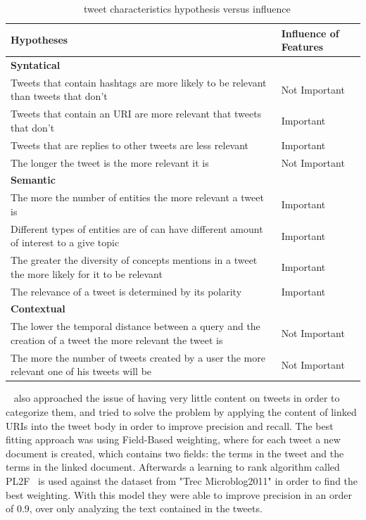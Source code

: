 \begin{table}[tb]
  \caption{~\citet{Tao2012} tweet characteristics hypothesis versus influence}
  \label{tab:tao_table}
  \begin{tabularx}{\textwidth}{|X|l|}
  \hline
  \textbf{Hypotheses} & \textbf{Influence of Features} \\
  \hline
  \hline

  {\bf Syntatical} &  \\
  \hline
  Tweets that contain hashtags are more likely to be relevant than tweets that don't & Not Important \\
  \hline
  Tweets that contain an URI are more relevant that tweets that don't  &Important \\
  \hline
  Tweets that are replies to other tweets are less relevant & Important \\
  \hline
  The longer the tweet is the more relevant it is & Not Important\\
  \hline
  \hline

  {\bf Semantic}  &  \\
  \hline
  
  The more the number of entities the more relevant a tweet is  & Important \\
  \hline
  Different types of entities are of can have different amount of interest to a give topic  & Important \\
  \hline
  The greater the diversity of concepts mentions in a tweet the more likely for it to be relevant & Important \\
  \hline
  The relevance of a tweet is determined by its polarity & Important \\
  \hline
  \hline

  {\bf Contextual} &  \\
  \hline
  The lower the temporal distance between a query and the creation of a tweet the more relevant the tweet is  & Not Important \\
  \hline
  The more the number of tweets created by a user the more relevant one of his tweets will be & Not Important \\
  \hline
  \end{tabularx}
\end{table}

~\citet{McCreadie2013} also approached the issue of having very little content on tweets in order to categorize them, and tried to solve the problem by applying the content of linked URIs into the tweet body in order to improve precision and recall. The best fitting approach was using Field-Based weighting, where for each tweet a new document is created, which contains two fields: the terms in the tweet and the terms in the linked document. 
Afterwards a learning to rank algorithm called PL2F~\cite{macdonald2008} is used against the dataset from "Trec Microblog2011" in order to find the best weighting. 
With this model they were able to improve precision in an order of 0.9, over only analyzing the text contained in the tweets. 

